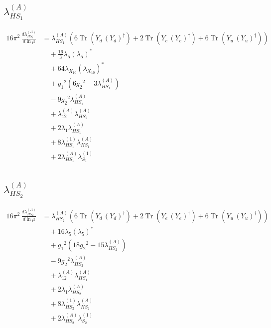 \documentclass[10pt,a4paper]{article}
\begin{document}
\subsection*{$\lambda_{HS_1}^{(A)}$}
\begin{align*}
16\pi^2\,\frac{d \lambda_{HS_1}^{(A)}}{d\ln\mu} &={\lambda_{HS_1}^{(A)}} (6 \operatorname{Tr}\!\left({Y_d}\,\left({Y_d}\right)^{\dagger}\right)+2 \operatorname{Tr}\!\left({Y_e}\,\left({Y_e}\right)^{\dagger}\right)+6 \operatorname{Tr}\!\left({Y_u}\,\left({Y_u}\right)^{\dagger}\right)) \\
&\quad +\frac{16}{3} {\lambda_5} \left({\lambda_5}\right)^{*} \\
&\quad +64 {\lambda_{X_{10}}} \left({\lambda_{X_{10}}}\right)^{*} \\
&\quad +{g_1}^2 \left(6 {g_2}^2-3 {\lambda_{HS_1}^{(A)}}\right) \\
&\quad -9 {g_2}^2 {\lambda_{HS_1}^{(A)}} \\
&\quad +{\lambda_{12}^{(A)}} {\lambda_{HS_2}^{(A)}} \\
&\quad +2 {\lambda_1} {\lambda_{HS_1}^{(A)}} \\
&\quad +8 {\lambda_{HS_1}^{(1)}} {\lambda_{HS_1}^{(A)}} \\
&\quad +2 {\lambda_{HS_1}^{(A)}} {\lambda_{S_1}^{(1)}} \\
\end{align*}
\subsection*{$\lambda_{HS_2}^{(A)}$}
\begin{align*}
16\pi^2\,\frac{d \lambda_{HS_2}^{(A)}}{d\ln\mu} &={\lambda_{HS_2}^{(A)}} (6 \operatorname{Tr}\!\left({Y_d}\,\left({Y_d}\right)^{\dagger}\right)+2 \operatorname{Tr}\!\left({Y_e}\,\left({Y_e}\right)^{\dagger}\right)+6 \operatorname{Tr}\!\left({Y_u}\,\left({Y_u}\right)^{\dagger}\right)) \\
&\quad +16 {\lambda_5} \left({\lambda_5}\right)^{*} \\
&\quad +{g_1}^2 \left(18 {g_2}^2-15 {\lambda_{HS_2}^{(A)}}\right) \\
&\quad -9 {g_2}^2 {\lambda_{HS_2}^{(A)}} \\
&\quad +{\lambda_{12}^{(A)}} {\lambda_{HS_1}^{(A)}} \\
&\quad +2 {\lambda_1} {\lambda_{HS_2}^{(A)}} \\
&\quad +8 {\lambda_{HS_2}^{(1)}} {\lambda_{HS_2}^{(A)}} \\
&\quad +2 {\lambda_{HS_2}^{(A)}} {\lambda_{S_2}^{(1)}} \\
\end{align*}
\end{document}
